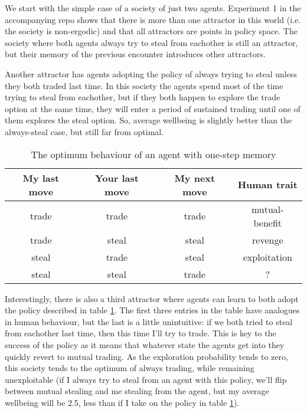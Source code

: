 \documentclass[a4paper]{report}
\begin{document}
We start with the simple case of a society of just two agents. Experiment 1 in the accompanying repo shows that there is more than one attractor in this world (i.e. the society is non-ergodic) and that all attractors are points in policy space. The society where both agents always try to steal from eachother is still an attractor, but their memory of the previous encounter introduces other attractors.

Another attractor has agents adopting the policy of always trying to steal unless they both traded last time. In this society the agents spend most of the time trying to steal from eachother, but if they both happen to explore the trade option at the same time, they will enter a period of sustained trading until one of them explores the steal option. So, average wellbeing is slightly better than the always-steal case, but still far from optimal.


\begin{table}
	\begin{center}
		\begin{tabular}{cccc}
My last move & Your last move & My next move & Human trait\\
\hline
trade & trade &  trade &	 mutual-benefit \\
trade & steal &  steal &	 revenge \\
steal & trade &  steal &	 exploitation \\
steal & steal &  trade &	 ? \\
\hline
\end{tabular}
\end{center}
\caption{The optimum behaviour of an agent with one-step memory}
\label{optimalpolicy1}
\end{table}

Interestingly, there is also a third attractor where agents can learn to both adopt the policy described in table \ref{optimalpolicy1}. The first three entries in the table have analogues in human behaviour, but the last is a little unintuitive: if we both tried to steal from eachother last time, then this time I'll try to trade. This is key to the success of the policy as it means that whatever state the agents get into they quickly revert to mutual trading. As the exploration probability tends to zero, this society tends to the optimum of always trading, while remaining unexploitable (if I always try to steal from an agent with this policy, we'll flip between mutual stealing and me stealing from the agent, but my average wellbeing will be 2.5, less than if I take on the policy in table \ref{optimalpolicy1}).
\end{document}
